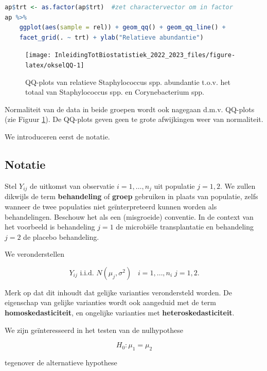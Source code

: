 \documentclass[
  12pt,dutch,coursenotes]{book}
\begin{document}
\begin{lstlisting}[language=R]
ap$trt <- as.factor(ap$trt)  #zet charactervector om in factor
ap %>%
    ggplot(aes(sample = rel)) + geom_qq() + geom_qq_line() +
    facet_grid(. ~ trt) + ylab("Relatieve abundantie")
\end{lstlisting}

\begin{figure}

{\centering \texttt{[image: InleidingTotBiostatistiek\_2022\_2023\_files/figure-latex/okselQQ-1]} 

}

\caption{QQ-plots van relatieve Staphylococcus spp. abundantie t.o.v. het totaal van Staphylococcus spp. en Corynebacterium spp.}\label{fig:okselQQ}
\end{figure}

Normaliteit van de data in beide groepen wordt ook nagegaan d.m.v. QQ-plots (zie Figuur \ref{fig:okselQQ}). De QQ-plots geven geen te grote afwijkingen weer van normaliteit.

We introduceren eerst de notatie.

\hypertarget{notatie}{%
\subsection{Notatie}\label{notatie}}

Stel \(Y_{ij}\) de uitkomst van observatie \(i=1,\ldots, n_j\) uit populatie \(j=1,2\). We zullen dikwijls de term \textbf{behandeling} of \textbf{groep} gebruiken in plaats van populatie, zelfs wanneer de twee populaties niet geïnterpreteerd kunnen worden als behandelingen. Beschouw het als een (misgroeide) conventie. In de context van het voorbeeld is behandeling \(j=1\) de microbiële transplantatie en behandeling \(j=2\) de placebo behandeling.

We veronderstellen

\[Y_{ij}\text{ i.i.d. } N(\mu_j,\sigma^2)\;\;\;i=1,\ldots,n_i\;j=1,2.\]

Merk op dat dit inhoudt dat gelijke varianties verondersteld worden. De eigenschap van gelijke varianties wordt ook aangeduid met de term \textbf{homoskedasticiteit}, en ongelijke varianties met \textbf{heteroskedasticiteit}.

We zijn geïnteresseerd in het testen van de nulhypothese

\[ H_0: \mu_1 = \mu_2 \]

tegenover de alternatieve hypothese
\end{document}
